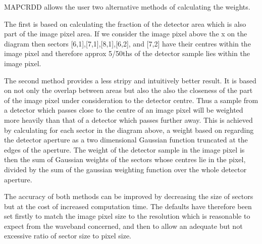 \documentclass[twoside,11pt]{starlink}
\begin{document}
MAPCRDD allows the user two alternative methods of calculating the weights.

The first is based on calculating the fraction of the detector area which is
also part of the image pixel area. If we consider the image pixel above the x
on the diagram then sectors [6,1],[7,1],[8,1],[6,2], and [7,2] have their
centres within the image pixel and therefore approx 5/50ths of the detector
sample lies within the image pixel.

The second method provides a less stripy and intuitively better result. It is
based on not only the overlap between areas but also the also the closeness of
the part of the image pixel under consideration to the detector centre. Thus a
sample from a detector which passes close to the centre of  an image pixel will
be weighted more heavily than that of a detector which passes further away.
This is achieved by calculating for each sector in the diagram above, a weight
based on regarding the detector aperture as a two dimensional Gaussian function
truncated at the edges of the aperture. The weight of the detector sample in
the image pixel is then the sum of Gaussian weights of the sectors whose centres
lie in the pixel, divided by the sum of the gaussian weighting function over
the whole detector aperture.

The accuracy of both methods can be improved by decreasing the size of sectors
but at the cost of increased computation time. The defaults have
therefore been set firstly to match the image pixel size to the resolution
which is reasonable to expect from the waveband concerned, and then to allow an
adequate but not excessive ratio of sector size to pixel size.
\end{document}
